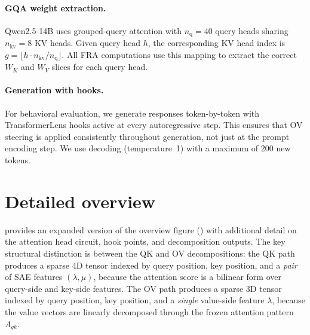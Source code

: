 \documentclass{article}
\theoremstyle{plain}
\theoremstyle{definition}
\theoremstyle{remark}
\newcommand{\WK}{W_K}
\newcommand{\WV}{W_V}
\newcommand{\dmodel}{d_{\mathrm{model}}}
\newcommand{\dhead}{d_{\mathrm{head}}}
\begin{document}

\paragraph{GQA weight extraction.} Qwen2.5-14B uses grouped-query attention with $n_{\mathrm{q}} = 40$ query heads sharing $n_{\mathrm{kv}} = 8$ KV heads. Given query head $h$, the corresponding KV head index is $g = \lfloor h \cdot n_{\mathrm{kv}} / n_{\mathrm{q}} \rfloor$. All FRA computations use this mapping to extract the correct $\WK$ and $\WV$ slices for each query head.


\paragraph{Generation with hooks.} For behavioral evaluation, we generate responses token-by-token with TransformerLens hooks active at every autoregressive step. This ensures that OV steering is applied consistently throughout generation, not just at the prompt encoding step. We use decoding (temperature~1) with a maximum of 200 new tokens.

\section{Detailed overview}\label{detailed_overview}
 provides an expanded version of the overview figure () with additional detail on the attention head circuit, hook points, and decomposition outputs. The key structural distinction is between the QK and OV decompositions: the QK path produces a sparse 4D tensor indexed by query position, key position, and a \emph{pair} of SAE features $(\lambda, \mu)$, because the attention score is a bilinear form over query-side and key-side features. The OV path produces a sparse 3D tensor indexed by query position, key position, and a \emph{single} value-side feature $\lambda$, because the value vectors are linearly decomposed through the frozen attention pattern $A_{qk}$.
\end{document}
